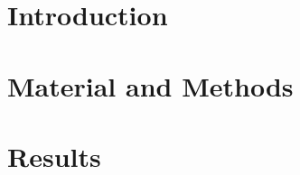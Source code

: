 \documentclass[
oneside,
a4paper,
12pt,
titlepage]
{article}
\begin{document}

\newpage


\newpage


\newpage

\pagestyle{standard}

\section{Introduction}

\section{Material and Methods}


% 
% 
% 
% 



\section{Results}



\newpage{}

\end{document}
